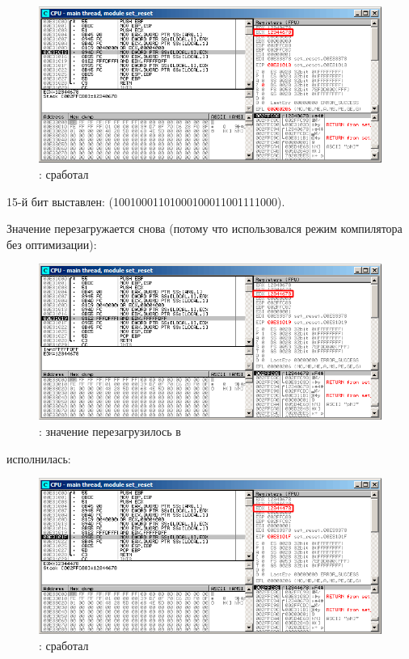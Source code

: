 \begin{figure}[H]
\centering
\includegraphics[scale=\FigScale]{patterns/14_bitfields/2_set_reset/olly2.png}
\caption{\olly: \OR сработал}
\label{fig:set_reset_olly2}
\end{figure}

15-й бит выставлен:  
(10010001101000{\color{red}1}00011001111000).

\clearpage
Значение перезагружается снова (потому что использовался режим компилятора без оптимизации): 

\begin{figure}[H]
\centering
\includegraphics[scale=\FigScale]{patterns/14_bitfields/2_set_reset/olly3.png}
\caption{\olly: значение перезагрузилось в \EDX}
\label{fig:set_reset_olly3}
\end{figure}

\clearpage
\AND исполнилась:

\begin{figure}[H]
\centering
\includegraphics[scale=\FigScale]{patterns/14_bitfields/2_set_reset/olly4.png}
\caption{\olly: \AND сработал}
\label{fig:set_reset_olly4}
\end{figure}

